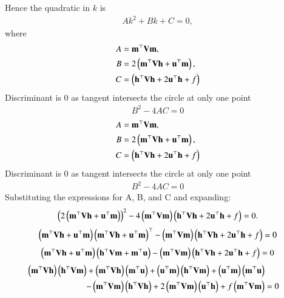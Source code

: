 \documentclass[journal]{IEEEtran}
\begin{document}
Hence the quadratic in $k$ is
\begin{align}
A k^2 + B k + C = 0,
\end{align}
where
\begin{align}
A &= \mathbf{m}^{\top} \mathbf{V} \mathbf{m}, \\
B &= 2 \left( \mathbf{m}^{\top} \mathbf{V} \mathbf{h} + \mathbf{u}^{\top} \mathbf{m} \right), \\
C &= \left( \mathbf{h}^{\top} \mathbf{V} \mathbf{h} + 2 \mathbf{u}^{\top} \mathbf{h} + f \right)
\end{align}
Discriminant is 0 as tangent intersects the circle at only one point
\begin{align}
B^2 - 4AC = 0 
\end{align}
\begin{align}
A &= \mathbf{m}^{\top} \mathbf{V} \mathbf{m}, \\
B &= 2 \left( \mathbf{m}^{\top} \mathbf{V} \mathbf{h} + \mathbf{u}^{\top} \mathbf{m} \right), \\
C &= \left( \mathbf{h}^{\top} \mathbf{V} \mathbf{h} + 2 \mathbf{u}^{\top} \mathbf{h} + f \right)
\end{align}
Discriminant is 0 as tangent intersects the circle at only one point
\begin{align}
B^2 - 4AC = 0 
\end{align}
Substituting the expressions for A, B, and C and expanding:
\begin{align}
\left(2 \left(\mathbf{m}^{\top}\mathbf{V}\mathbf{h} + \mathbf{u}^{\top}\mathbf{m}\right)\right) ^{2}
- 4 \left(\mathbf{m}^{\top}\mathbf{V}\mathbf{m}\right)\left(\mathbf{h}^{\top}\mathbf{V}\mathbf{h} + 2 \mathbf{u}^{\top}\mathbf{h} + f\right)
= 0.
\end{align}
\begin{align}
\left(\mathbf{m}^{\top}\mathbf{V}\mathbf{h}+\mathbf{u}^{\top}\mathbf{m}\right)\left(\mathbf{m}^{\top}\mathbf{V}\mathbf{h} + \mathbf{u}^{\top}\mathbf{m}\right)^\top-\left(\mathbf{m}^{\top}\mathbf{V}\mathbf{m}\right)\left(\mathbf{h}^{\top}\mathbf{V}\mathbf{h} + 2 \mathbf{u}^{\top}\mathbf{h} + f\right)
= 0
\end{align}
\begin{align}
\left(\mathbf{m}^{\top}\mathbf{V}\mathbf{h} + \mathbf{u}^{\top}\mathbf{m}\right)\left(\mathbf{h}^{\top}\mathbf{V}\mathbf{m}+\mathbf{m}^{\top}\mathbf{u}\right)-\left(\mathbf{m}^{\top}\mathbf{V}\mathbf{m}\right)\left(\mathbf{h}^{\top}\mathbf{V}\mathbf{h} + 2 \mathbf{u}^{\top}\mathbf{h} + f\right)=0
\end{align}
\begin{align}
\left(\mathbf{m}^{\top} \mathbf{V} \mathbf{h}\right)\left(\mathbf{h}^{\top} \mathbf{V} \mathbf{m}\right) + \left(\mathbf{m}^{\top} \mathbf{V} \mathbf{h}\right)\left(\mathbf{m}^{\top} \mathbf{u}\right) + \left(\mathbf{u}^{\top} \mathbf{m}\right)\left(\mathbf{h}^{\top} \mathbf{V} \mathbf{m}\right) + \left(\mathbf{u}^{\top} \mathbf{m}\right)\left(\mathbf{m}^{\top} \mathbf{u}\right) \nonumber \\
- \left(\mathbf{m}^{\top}\mathbf{V}\mathbf{m}\right)\left(\mathbf{h}^{\top}\mathbf{V}\mathbf{h}\right) + 2\left(\mathbf{m}^{\top}\mathbf{V}\mathbf{m}\right)\left(\mathbf{u}^{\top}\mathbf{h}\right) + f\left(\mathbf{m}^{\top}\mathbf{V}\mathbf{m}\right) &= 0
\end{align}
\end{document}
